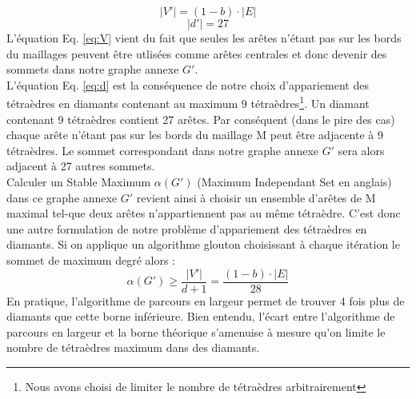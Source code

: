 \begin{equation}
\label{eq:V}
|V'|=(1-b)\cdot |E|
\end{equation}
\begin{equation}
\label{eq:d}
|d'|= 27
\end{equation}
L'équation Eq. \ref{eq:V} vient du fait que seules les arêtes n'étant pas sur les bords du maillages peuvent être utlisées comme arêtes centrales et donc devenir des sommets dans notre graphe annexe $G'$.\\
L'équation Eq. \ref{eq:d} est la conséquence de notre choix d'appariement des tétraèdres en diamants contenant au maximum 9 tétraèdres\footnote{Nous avons choisi de limiter le nombre de tétraèdres arbitrairement}. Un diamant contenant 9 tétraèdres contient 27 arêtes. Par conséquent (dans le pire des cas) chaque arête n'étant pas sur les bords du maillage M peut être adjacente à 9 tétraèdres. Le sommet correspondant dans notre graphe annexe $G'$ sera alors adjacent à 27 autres sommets.\\
Calculer un Stable Maximum $\alpha(G')$ (Maximum Independant Set en anglais) dans ce graphe annexe $G'$ revient ainsi à choisir un ensemble d'arêtes de M maximal tel-que deux arêtes n'appartiennent pas au même tétraèdre. C'est donc une autre formulation de notre problème d'appariement des tétraèdres en diamants. Si on applique un algorithme glouton choisissant à chaque itération le sommet de maximum degré alors :
\begin{equation}
\alpha(G')\geqslant \frac{|V'|}{d+1} = \frac{(1-b)\cdot |E|}{28}
\end{equation}
En pratique, l'algorithme de parcours en largeur permet de trouver 4 fois plus de diamants que cette borne inférieure. Bien entendu, l'écart entre l'algorithme de parcours en largeur et la borne théorique s'amenuise à mesure qu'on limite le nombre de tétraèdres maximum dans des diamants. 
